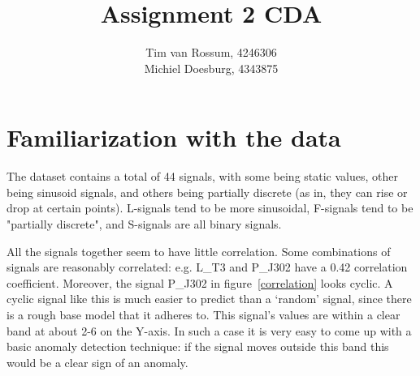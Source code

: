 \documentclass[]{article}
\title{Assignment 2 CDA}
\author{Tim van Rossum, 4246306\\
	Michiel Doesburg, 4343875}
\begin{document}
\maketitle
\section{Familiarization with the data}
The dataset contains a total of 44 signals, with some being static values, other being sinusoid signals, and others being partially discrete (as in, they can rise or drop at certain points). L-signals tend to be more sinusoidal, F-signals tend to be "partially discrete", and S-signals are all binary signals.

All the signals together seem to have little correlation. Some combinations of signals are reasonably correlated: e.g. L\_T3 and P\_J302 have a 0.42 correlation coefficient. Moreover, the signal P\_J302 in figure~\ref{correlation} looks cyclic. A cyclic signal like this is much easier to predict than a `random' signal, since there is a rough base model that it adheres to. This signal's values are within a clear band at about 2-6 on the Y-axis. In such a case it is very easy to come up with a basic anomaly detection technique: if the signal moves outside this band this would be a clear sign of an anomaly. 
\end{document}
